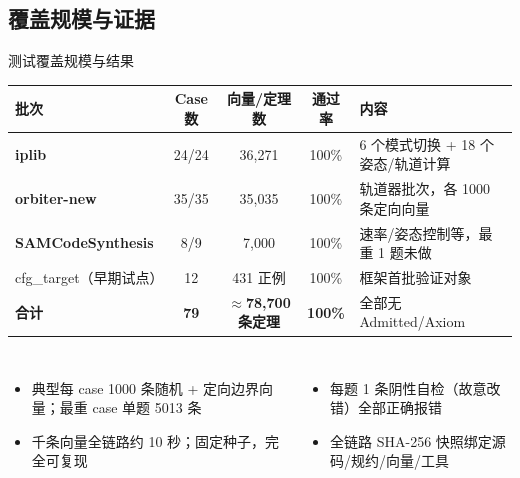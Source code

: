 \documentclass[UTF8,aspectratio=169]{ctexbeamer}
\begin{document}
\subsection{覆盖规模与证据}
\begin{frame}{测试覆盖规模与结果}
  \centering\footnotesize
  \begin{tabular}{@{}lcccl@{}}
    \toprule
    批次 & Case 数 & 向量/定理数 & 通过率 & 内容 \\
    \midrule
    \textbf{iplib} & 24/24 & 36{,}271 & 100\% & 6 个模式切换 + 18 个姿态/轨道计算 \\
    \textbf{orbiter-new} & 35/35 & 35{,}035 & 100\% & 轨道器批次，各 1000 条定向向量 \\
    \textbf{SAMCodeSynthesis} & 8/9 & 7{,}000 & 100\% & 速率/姿态控制等，最重 1 题未做 \\
    cfg\_target（早期试点） & 12 & 431 正例 & 100\% & 框架首批验证对象 \\
    \midrule
    \textbf{合计} & \textbf{79} & \textbf{$\approx$78{,}700 条定理} & \textbf{100\%} & 全部无 Admitted/Axiom \\
    \bottomrule
  \end{tabular}
  \vspace{1em}
  \begin{columns}[T]
    \begin{itemize}\small
      \item 典型每 case 1000 条随机 + 定向边界向量；最重 case 单题 5013 条
      \item 千条向量全链路约 10 秒；固定种子，完全可复现
    \end{itemize}
    \begin{itemize}\small
      \item 每题 1 条阴性自检（故意改错）全部正确报错
      \item 全链路 SHA-256 快照绑定源码/规约/向量/工具
    \end{itemize}
  \end{columns}
\end{frame}
\end{document}
